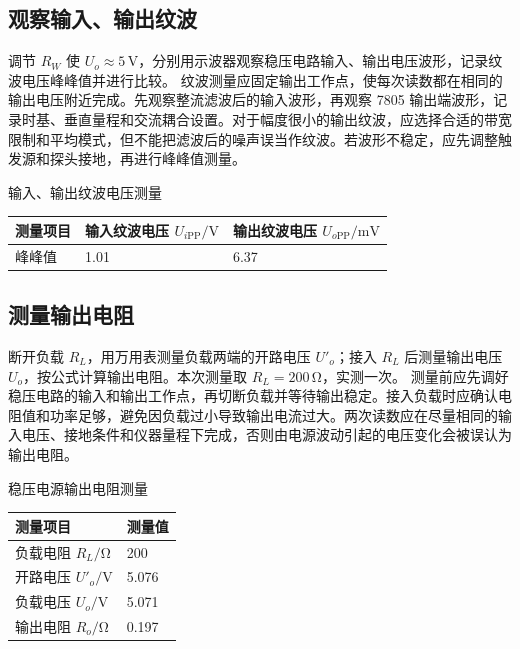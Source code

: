 \documentclass{../template/myrpt}
\begin{document}
\subsection{观察输入、输出纹波}
调节 $R_W$ 使 $U_o\approx5\,\si{\volt}$，分别用示波器观察稳压电路输入、输出电压波形，记录纹波电压峰峰值并进行比较。
纹波测量应固定输出工作点，使每次读数都在相同的输出电压附近完成。先观察整流滤波后的输入波形，再观察 7805 输出端波形，记录时基、垂直量程和交流耦合设置。对于幅度很小的输出纹波，应选择合适的带宽限制和平均模式，但不能把滤波后的噪声误当作纹波。若波形不稳定，应先调整触发源和探头接地，再进行峰峰值测量。

\begin{LabRecordTable}
  \centering
  \caption{输入、输出纹波电压测量}
  \label{table:ripple}
  \renewcommand{\arraystretch}{1.45}
  \small
  \begin{tabularx}{\textwidth}{C{5.0cm} Y Y}
    \toprule
    测量项目 & 输入纹波电压 $U_{i\mathrm{PP}}/\si{\volt}$ & 输出纹波电压 $U_{o\mathrm{PP}}/\si{\milli\volt}$ \\
    \midrule
    峰峰值 & 1.01 & 6.37 \\
    \bottomrule
  \end{tabularx}
\end{LabRecordTable}

\subsection{测量输出电阻}
断开负载 $R_L$，用万用表测量负载两端的开路电压 $U'_o$；接入 $R_L$ 后测量输出电压 $U_o$，按公式计算输出电阻。本次测量取 $R_L=200\,\si{\ohm}$，实测一次。
测量前应先调好稳压电路的输入和输出工作点，再切断负载并等待输出稳定。接入负载时应确认电阻值和功率足够，避免因负载过小导致输出电流过大。两次读数应在尽量相同的输入电压、接地条件和仪器量程下完成，否则由电源波动引起的电压变化会被误认为输出电阻。

\begin{LabRecordTable}
  \centering
  \caption{稳压电源输出电阻测量}
  \label{table:output-resistance}
  \renewcommand{\arraystretch}{1.4}
  \small
  \begin{tabularx}{\textwidth}{C{7.0cm} Y}
    \toprule
    测量项目 & 测量值 \\
    \midrule
    负载电阻 $R_L/\si{\ohm}$ & 200 \\
    开路电压 $U'_o/\si{\volt}$ & 5.076 \\
    负载电压 $U_o/\si{\volt}$ & 5.071 \\
    输出电阻 $R_o/\si{\ohm}$ & 0.197 \\
    \bottomrule
  \end{tabularx}
\end{LabRecordTable}
\end{document}
